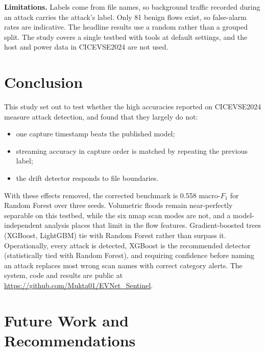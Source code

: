 \documentclass[conference]{IEEEtran}
\begin{document}
\textbf{Limitations.} Labels come from file names, so background traffic recorded during an attack carries the attack's label. Only 81 benign flows exist, so false-alarm rates are indicative. The headline results use a random rather than a grouped split. The study covers a single testbed with tools at default settings, and the host and power data in CICEVSE2024 are not used.

\section{Conclusion}
\label{sec:conclusion}

This study set out to test whether the high accuracies reported on CICEVSE2024 measure attack detection, and found that they largely do not:
\begin{itemize}
    \item one capture timestamp beats the published model;
    \item streaming accuracy in capture order is matched by repeating the previous label;
    \item the drift detector responds to file boundaries.
\end{itemize}
With these effects removed, the corrected benchmark is 0.558 macro-$F_1$ for Random Forest over three seeds. Volumetric floods remain near-perfectly separable on this testbed, while the six nmap scan modes are not, and a model-independent analysis places that limit in the flow features. Gradient-boosted trees (XGBoost, LightGBM) tie with Random Forest rather than surpass it. Operationally, every attack is detected, XGBoost is the recommended detector (statistically tied with Random Forest), and requiring confidence before naming an attack replaces most wrong scan names with correct category alerts. The system, code and results are public at \url{https://github.com/Mukta01/EVNet_Sentinel}.

\section{Future Work and Recommendations}
\end{document}
